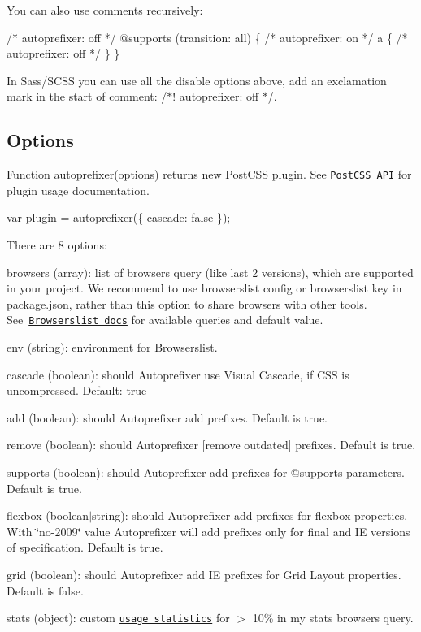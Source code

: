You can also use comments recursively\+:


\begin{DoxyCode}
/* autoprefixer: off */
@supports (transition: all) \{
    /* autoprefixer: on */
    a \{
        /* autoprefixer: off */
    \}
\}
\end{DoxyCode}


In Sass/\+S\+C\+SS you can use all the disable options above, add an exclamation mark in the start of comment\+: {\ttfamily /$\ast$! autoprefixer\+: off $\ast$/}.

\subsection*{Options}

Function {\ttfamily autoprefixer(options)} returns new Post\+C\+SS plugin. See \href{http://api.postcss.org}{\tt Post\+C\+SS A\+PI} for plugin usage documentation.


\begin{DoxyCode}
var plugin = autoprefixer(\{ cascade: false \});
\end{DoxyCode}


There are 8 options\+:


\begin{DoxyItemize}
\item {\ttfamily browsers} (array)\+: list of browsers query (like {\ttfamily last 2 versions}), which are supported in your project. We recommend to use {\ttfamily browserslist} config or {\ttfamily browserslist} key in {\ttfamily package.\+json}, rather than this option to share browsers with other tools. See \href{https://github.com/ai/browserslist#queries}{\tt Browserslist docs} for available queries and default value.
\item {\ttfamily env} (string)\+: environment for Browserslist.
\item {\ttfamily cascade} (boolean)\+: should Autoprefixer use Visual Cascade, if C\+SS is uncompressed. Default\+: {\ttfamily true}
\item {\ttfamily add} (boolean)\+: should Autoprefixer add prefixes. Default is {\ttfamily true}.
\item {\ttfamily remove} (boolean)\+: should Autoprefixer \mbox{[}remove outdated\mbox{]} prefixes. Default is {\ttfamily true}.
\item {\ttfamily supports} (boolean)\+: should Autoprefixer add prefixes for {\ttfamily @supports} parameters. Default is {\ttfamily true}.
\item {\ttfamily flexbox} (boolean$\vert$string)\+: should Autoprefixer add prefixes for flexbox properties. With {\ttfamily \char`\"{}no-\/2009\char`\"{}} value Autoprefixer will add prefixes only for final and IE versions of specification. Default is {\ttfamily true}.
\item {\ttfamily grid} (boolean)\+: should Autoprefixer add IE prefixes for Grid Layout properties. Default is {\ttfamily false}.
\item {\ttfamily stats} (object)\+: custom \href{https://github.com/ai/browserslist#custom-usage-data}{\tt usage statistics} for {\ttfamily $>$ 10\% in my stats} browsers query.
\end{DoxyItemize}


